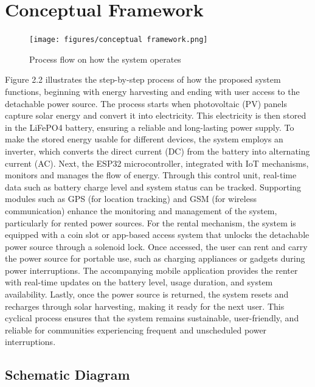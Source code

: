 {\section{Conceptual Framework}

\begin{figure}[H]
	\centering
	\caption{Process flow on how the system operates}
	\label{fig:conceptualfra}
	\texttt{[image: figures/conceptual framework.png]}
\end{figure}


Figure 2.2 illustrates the step-by-step process of how the proposed system functions, beginning with energy harvesting and ending with user access to the detachable power source. The process starts when photovoltaic (PV) panels capture solar energy and convert it into electricity. This electricity is then stored in the LiFePO4 battery, ensuring a reliable and long-lasting power supply. To make the stored energy usable for different devices, the system employs an inverter, which converts the direct current (DC) from the battery into alternating current (AC). Next, the ESP32 microcontroller, integrated with IoT mechanisms, monitors and manages the flow of energy. Through this control unit, real-time data such as battery charge level and system status can be tracked. Supporting modules such as GPS (for location tracking) and GSM (for wireless communication) enhance the monitoring and management of the system, particularly for rented power sources. For the rental mechanism, the system is equipped with a coin slot or app-based access system that unlocks the detachable power source through a solenoid lock. Once accessed, the user can rent and carry the power source for portable use, such as charging appliances or gadgets during power interruptions. The accompanying mobile application provides the renter with real-time updates on the battery level, usage duration, and system availability. Lastly, once the power source is returned, the system resets and recharges through solar harvesting, making it ready for the next user. This cyclical process ensures that the system remains sustainable, user-friendly, and reliable for communities experiencing frequent and unscheduled power interruptions.

\subsection{Schematic Diagram}

}
